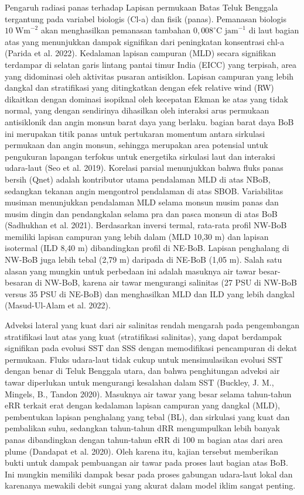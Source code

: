 \begin{spacing}{1.5}
	Pengaruh radiasi panas terhadap Lapisan permukaan Batas Teluk Benggala tergantung pada variabel biologis (Cl-a) dan fisik (panas). Pemanasan biologis $10\; \text{Wm}^{-2}$ akan menghasilkan pemanasan tambahan $0,008^\circ \text{C jam}^{-1}$ di laut bagian atas yang menunjukkan dampak signifikan dari peningkatan konsentrasi chl-a (Parida et al. 2022). Kedalaman lapisan campuran (MLD) secara signifikan terdampar di selatan garis lintang pantai timur India (EICC) yang terpisah, area yang didominasi oleh aktivitas pusaran antisiklon. Lapisan campuran yang lebih dangkal dan stratifikasi yang ditingkatkan dengan efek relative wind (RW) dikaitkan dengan dominasi isopiknal oleh kecepatan Ekman ke atas yang tidak normal, yang dengan sendirinya dihasilkan oleh interaksi arus permukaan antisiklonik dan angin monsun barat daya yang berlaku. bagian barat daya BoB ini merupakan titik panas untuk pertukaran momentum antara sirkulasi permukaan dan angin monsun, sehingga merupakan area potensial untuk pengukuran lapangan terfokus untuk energetika sirkulasi laut dan interaksi udara-laut (Seo et al. 2019). Korelasi parsial menunjukkan bahwa fluks panas bersih (Qnet) adalah kontributor utama pendalaman MLD di atas NBoB, sedangkan tekanan angin mengontrol pendalaman di atas SBOB. Variabilitas musiman menunjukkan pendalaman MLD selama monsun musim panas dan musim dingin dan pendangkalan selama pra dan pasca monsun di atas BoB  (Sadhukhan et al. 2021). Berdasarkan inversi termal, rata-rata profil NW-BoB memiliki lapisan campuran yang lebih dalam (MLD 10,30 m) dan lapisan isotermal (ILD 8,40 m) dibandingkan profil di NE-BoB. Lapisan penghalang di NW-BoB juga lebih tebal (2,79 m) daripada di NE-BoB (1,05 m). Salah satu alasan yang mungkin untuk perbedaan ini adalah masuknya air tawar besar-besaran di NW-BoB, karena air tawar mengurangi salinitas (27 PSU di NW-BoB versus 35 PSU di NE-BoB) dan menghasilkan MLD dan ILD yang lebih dangkal (Masud-Ul-Alam et al. 2022).
	
	Adveksi lateral yang kuat dari air salinitas rendah mengarah pada pengembangan stratifikasi laut atas yang kuat (stratifikasi salinitas), yang dapat berdampak signifikan pada evolusi SST dan SSS dengan memodifikasi pencampuran di dekat permukaan. Fluks udara-laut tidak cukup untuk mensimulasikan evolusi SST dengan benar di Teluk Benggala utara, dan bahwa penghitungan adveksi air tawar diperlukan untuk mengurangi kesalahan dalam SST (Buckley, J. M., Mingels, B., Tandon 2020). Masuknya air tawar yang besar selama tahun-tahun eRR terkait erat dengan kedalaman lapisan campuran yang dangkal (MLD), pembentukan lapisan penghalang yang tebal (BL), dan sirkulasi yang kuat dan pembalikan suhu, sedangkan tahun-tahun dRR mengumpulkan lebih banyak panas dibandingkan dengan tahun-tahun eRR di 100 m bagian atas dari area plume (Dandapat et al. 2020). Oleh karena itu, kajian tersebut memberikan bukti untuk dampak pembuangan air tawar pada proses laut bagian atas BoB. Ini mungkin memiliki dampak besar pada proses gabungan udara-laut lokal dan karenanya mewakili debit sungai yang akurat dalam model iklim sangat penting.
	

\end{spacing}
